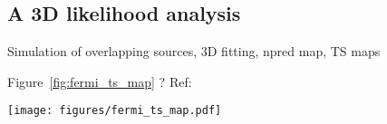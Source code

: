 \subsection{A 3D likelihood analysis}
\label{ssec:3D-analysis}


Simulation of overlapping sources, 3D fitting, npred map, TS maps

 Figure~\ref{fig:fermi_ts_map} ?
Ref:~\citep{Stewart2009}
\begin{figure*}[t]
        \centering
        \texttt{[image: figures/fermi\_ts\_map.pdf]}
        \caption{Fermi-LAT TS map in two energy bands} \label{fig:fermi_ts_map}
\end{figure*}

